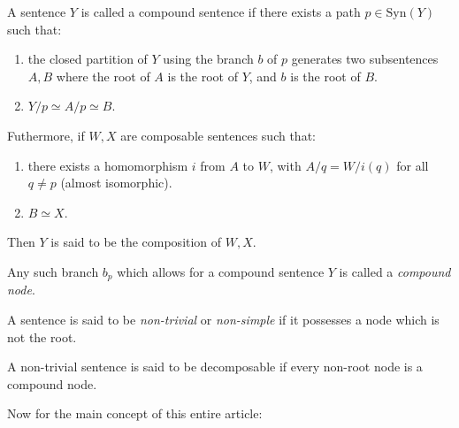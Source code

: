 \documentclass[twoside]{article}
\newenvironment{definition}[1][Definition]{\begin{trivlist}
\item[\hskip \labelsep {\bfseries #1}]}{\end{trivlist}}
\begin{document}
\begin{definition}[Compound Sentence]

A sentence $ Y $ is called a compound sentence if there exists a path $ p\in\mbox{Syn}(Y) $ such that:
\begin{enumerate}

\item the closed partition of $ Y $ using the branch $ b $ of $ p $ generates two subsentences $ A, B $ where the
root of $ A $ is the root of $ Y $, and $ b $ is the root of $ B $.

\item $ Y/p\simeq A/p\simeq B $.

\end{enumerate}
Futhermore, if $ W, X $ are composable sentences such that:
\begin{enumerate}

\item there exists a homomorphism $ i $ from $ A $ to $ W $, with $ A/q=W/i(q) $ for all $ q\neq p $ (almost isomorphic).

\item $ B\simeq X $.

\end{enumerate}
Then $ Y $ is said to be the composition of $ W, X $.

\end{definition}
Any such branch $ b_p $ which allows for a compound sentence $ Y $ is called a \emph{compound node}.

A sentence is said to be \emph{non-trivial} or \emph{non-simple} if it possesses a node which is not the root.

\begin{definition}[Decomposable Sentence]

A non-trivial sentence is said to be decomposable if every non-root node is a compound node.

\end{definition}

Now for the main concept of this entire article:
\end{document}
